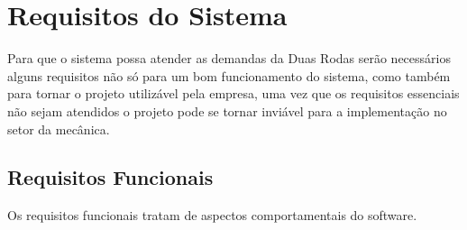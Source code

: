 \chapter{Requisitos do Sistema}

Para que o sistema possa atender as demandas da Duas Rodas serão necessários alguns requisitos não só para um bom funcionamento do sistema, como também para tornar o projeto utilizável pela empresa, uma vez que os requisitos essenciais não sejam atendidos o projeto pode se tornar inviável para a implementação no setor da mecânica.


\section{Requisitos Funcionais}
Os requisitos funcionais tratam de aspectos comportamentais do software.\cite{alvarenga2007abordagem}


